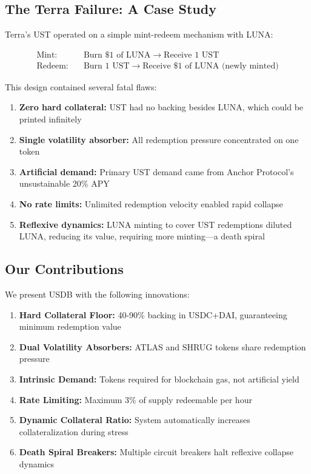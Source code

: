 \documentclass[11pt,a4paper]{article}
\begin{document}
\subsection{The Terra Failure: A Case Study}

Terra's UST operated on a simple mint-redeem mechanism with LUNA:

\begin{align}
\text{Mint:} &\quad \text{Burn } \$1 \text{ of LUNA} \to \text{Receive } 1 \text{ UST} \\
\text{Redeem:} &\quad \text{Burn } 1 \text{ UST} \to \text{Receive } \$1 \text{ of LUNA (newly minted)}
\end{align}

This design contained several fatal flaws:

\begin{enumerate}
    \item \textbf{Zero hard collateral:} UST had no backing besides LUNA, which could be printed infinitely
    \item \textbf{Single volatility absorber:} All redemption pressure concentrated on one token
    \item \textbf{Artificial demand:} Primary UST demand came from Anchor Protocol's unsustainable 20\% APY
    \item \textbf{No rate limits:} Unlimited redemption velocity enabled rapid collapse
    \item \textbf{Reflexive dynamics:} LUNA minting to cover UST redemptions diluted LUNA, reducing its value, requiring more minting---a death spiral
\end{enumerate}

\subsection{Our Contributions}

We present USDB with the following innovations:

\begin{enumerate}
    \item \textbf{Hard Collateral Floor:} 40-90\% backing in USDC+DAI, guaranteeing minimum redemption value
    \item \textbf{Dual Volatility Absorbers:} ATLAS and SHRUG tokens share redemption pressure
    \item \textbf{Intrinsic Demand:} Tokens required for blockchain gas, not artificial yield
    \item \textbf{Rate Limiting:} Maximum 3\% of supply redeemable per hour
    \item \textbf{Dynamic Collateral Ratio:} System automatically increases collateralization during stress
    \item \textbf{Death Spiral Breakers:} Multiple circuit breakers halt reflexive collapse dynamics
\end{enumerate}
\end{document}
